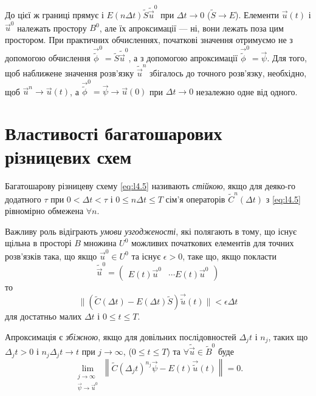 До цієї ж границі прямує і $E (n \Delta t) \tilde S \tilde{\vec{u}}^0$ при $\Delta t \to 0$ ($\tilde S \to E$). Елементи $\vec u(t)$ і $\vec u^0$ належать простору $B^0$, але їх апроксимації --- ні, вони лежать поза цим простором. При практичних обчисленнях, початкові значення отримуємо не з допомогою обчислення $\vec{\tilde{\phi}}^0 = \tilde S \tilde{\vec{u}}^0$, а з допомогою апроксимації $\vec{\tilde{\phi}}^0 = \vec \psi$. Для того, щоб наближене значення розв'язку $\tilde{\vec{u}}^n$ збігалось до точного розв'язку, необхідно, щоб $\vec u^n \to \vec u(t)$, а $\vec{\tilde{\phi}}^0 = \vec \psi \to \vec u(0)$ при $\Delta t \to 0$ незалежно одне від одного. 

\section{Властивості багатошарових різницевих схем}

\begin{definition}
    Багатошарову різницеву схему \eqref{eq:l4.5} називають \textit{стійкою}, якщо для деяко-го додатного $\tau$ при $0 < \Delta t < \tau$ і $0 \le n \Delta t \le T$ сім'я операторів $\tilde C^n(\Delta t)$ з \eqref{eq:l4.5} рівномірно обмежена $\forall n$.
\end{definition}

\begin{definition}
    Важливу роль відіграють \textit{умови узгодженості}, які полягають в тому, що існує щільна в просторі $B$ множина $U^0$ можливих початкових елементів для точних розв'язків така, що якщо $\vec u^0 \in U^0$ та існує $\epsilon > 0$, таке що, якщо покласти 
    \begin{equation}
        \tilde{\vec{u}}^0 = \begin{pmatrix} E(t) \vec u^0 & \cdots E(t) \vec u^0 \end{pmatrix}
    \end{equation}
    то 
    \begin{equation}
        \label{eq:l4.6}
        \| (\tilde C(\Delta t) - E(\Delta t) \tilde S) \vec{\tilde{u}}(t) \| < \epsilon \Delta t
    \end{equation}
    для достатньо малих $\Delta t$ і $0 \le t \le T$.
\end{definition}

\begin{definition}
    Апроксимація є \textit{збіжною}, якщо для довільних послідовностей $\Delta_j t$ і $n_j$, таких що $\Delta_j t > 0$ і $n_j \Delta_j t \to t$ при $j \to \infty$, ($0 \le t \le T$) та $\forall \tilde{\vec{u}} \in \tilde B^0$ буде
    \begin{equation}
        \lim_{\substack{j \to \infty \\ \vec \psi \to \vec u^0}} \left\| \tilde C(\Delta_j t)^{n_j} \vec \psi - E(t) \vec{\tilde{u}}(t) \right\| = 0.
    \end{equation}
\end{definition}

